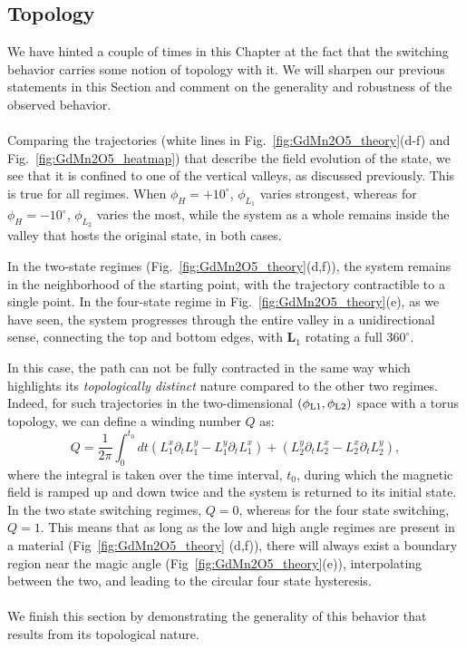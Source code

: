 \subsection{Topology \label{sec:GdMn2O5_topology}}
We have hinted a couple of times in this Chapter at the fact that the switching behavior carries some notion of topology with it.
We will sharpen our previous statements in this Section and comment on the generality and robustness of the observed behavior.
\\\\
Comparing the trajectories (white lines in Fig.~\ref{fig:GdMn2O5_theory}(d-f) and Fig.~\ref{fig:GdMn2O5_heatmap}) that describe the field evolution of the state, we see that it is confined to one of the vertical valleys, as discussed previously.
This is true for all regimes. When $\phi_H = +10^\circ$, $\phi_{L_1}$ varies strongest, whereas for $\phi_H = -10^\circ$, $\phi_{L_2}$ varies the most, while the system as a whole remains inside the valley that hosts the original state, in both cases.

In the two-state regimes (Fig.~\ref{fig:GdMn2O5_theory}(d,f)), the system remains in the neighborhood of the starting point, with the trajectory contractible to a single point. 
In the four-state regime in Fig.~\ref{fig:GdMn2O5_theory}(e), as we have seen, the system progresses through the entire valley in a unidirectional sense, connecting the top and bottom edges, with $\bm{L}_1$ rotating a full $360^\circ$.

In this case, the path can not be fully contracted in the same way which highlights its {\em  topologically distinct} nature compared to the other two regimes.
Indeed, for such trajectories in the two-dimensional $(\phi_{\rm L1},\phi_{\rm L2})$ space with a torus topology, we can define a winding number $Q$ as:
\begin{equation}
Q=\frac{1}{2\pi}\int_0^{t_0} dt (L_1^x\partial_t L_1^y - L_1^y \partial_t L_1^x) + (L_2^y\partial_t L_2^x - L_2^x \partial_t L_2^y),
\end{equation}
where the integral is taken over the time interval, $t_0$, during which the magnetic field is ramped up and down twice and the system is returned to its initial state.
In the two state switching regimes, $Q  = 0$, whereas for the four state switching, $Q = 1$.
This means that as long as the low and high angle regimes are present in a material (Fig~\ref{fig:GdMn2O5_theory} (d,f)), there will always exist a boundary region near the magic angle (Fig~\ref{fig:GdMn2O5_theory}(e)), interpolating between the two, and leading to the circular four state hysteresis.
\\\\
We finish this section by demonstrating the generality of this behavior that results from its topological nature.

